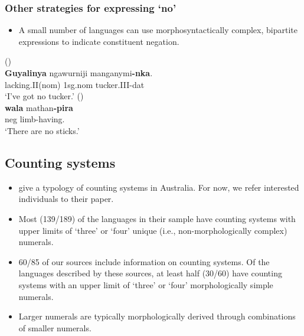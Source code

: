 \documentclass{article}
\begin{document}
\subsubsection{Other strategies for expressing `no'}

\begin{itemize}
\item A small number of languages can use morphosyntactically complex, bipartite expressions to indicate constituent negation.
\end{itemize}

\begin{exe}
   (\citealt[204]{nordlinger98})\\
  \gll \textbf{Guyalinya}  ngawurniji manganymi\textbf{-nka}.\\
  lacking.II({\sc nom}) 1{\sc sg.nom}  tucker.III-{\sc dat}\\
  \glt `I've got no tucker.'
   (\citealt[74]{oates88}) \\
  \gll \textbf{wala} mathan\textbf{-pira}\\
  {\sc neg} limb-having.\\
  \glt `There are no sticks.'%
\end{exe}

\subsection{Counting systems \label{countingsystemsection}}

\begin{itemize}
\item  \cite{bowernzentz12} give a typology of counting systems in Australia. For now, we refer interested individuals to their paper.
\item Most (139/189) of the languages in their sample have counting systems with upper limits of `three' or `four' unique (i.e., non-morphologically complex) numerals.
\item 60/85 of our sources include information on counting systems. Of the languages described by these sources, at least half (30/60) have counting systems with an upper limit of `three' or `four' morphologically simple numerals.
\item Larger numerals are typically morphologically derived through combinations of smaller numerals.
\end{itemize}
\end{document}
